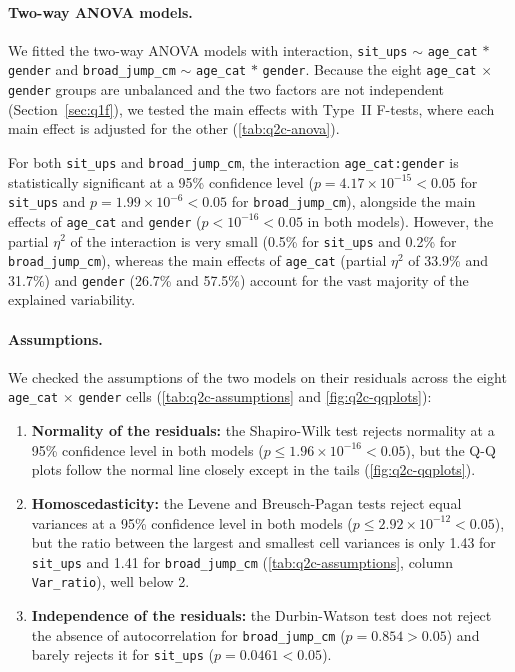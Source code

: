 
\paragraph{Two-way ANOVA models.}
We fitted the two-way ANOVA models with interaction, \texttt{sit\_ups} $\sim$ \texttt{age\_cat} $*$ \texttt{gender} and \texttt{broad\_jump\_cm} $\sim$ \texttt{age\_cat} $*$ \texttt{gender}.
Because the eight \texttt{age\_cat} $\times$ \texttt{gender} groups are unbalanced and the two factors are not independent (Section~\ref{sec:q1f}), we tested the main effects with Type~II F-tests, where each main effect is adjusted for the other (\autoref{tab:q2c-anova}).

For both \texttt{sit\_ups} and \texttt{broad\_jump\_cm}, the interaction \texttt{age\_cat:gender} is statistically significant at a 95\% confidence level ($p = 4.17 \times 10^{-15} < 0.05$ for \texttt{sit\_ups} and $p = 1.99 \times 10^{-6} < 0.05$ for \texttt{broad\_jump\_cm}), alongside the main effects of \texttt{age\_cat} and \texttt{gender} ($p < 10^{-16} < 0.05$ in both models).
However, the partial $\eta^2$ of the interaction is very small (0.5\% for \texttt{sit\_ups} and 0.2\% for \texttt{broad\_jump\_cm}), whereas the main effects of \texttt{age\_cat} (partial $\eta^2$ of 33.9\% and 31.7\%) and \texttt{gender} (26.7\% and 57.5\%) account for the vast majority of the explained variability.

\paragraph{Assumptions.}
We checked the assumptions of the two models on their residuals across the eight \texttt{age\_cat} $\times$ \texttt{gender} cells (\autoref{tab:q2c-assumptions} and \autoref{fig:q2c-qqplots}):
\begin{enumerate}
  \item \textbf{Normality of the residuals:} the Shapiro-Wilk test rejects normality at a 95\% confidence level in both models ($p \leq 1.96 \times 10^{-16} < 0.05$), but the Q-Q plots follow the normal line closely except in the tails (\autoref{fig:q2c-qqplots}).
  \item \textbf{Homoscedasticity:} the Levene and Breusch-Pagan tests reject equal variances at a 95\% confidence level in both models ($p \leq 2.92 \times 10^{-12} < 0.05$), but the ratio between the largest and smallest cell variances is only 1.43 for \texttt{sit\_ups} and 1.41 for \texttt{broad\_jump\_cm} (\autoref{tab:q2c-assumptions}, column \texttt{Var\_ratio}), well below 2.
  \item \textbf{Independence of the residuals:} the Durbin-Watson test does not reject the absence of autocorrelation for \texttt{broad\_jump\_cm} ($p = 0.854 > 0.05$) and barely rejects it for \texttt{sit\_ups} ($p = 0.0461 < 0.05$).
\end{enumerate}

